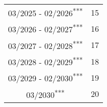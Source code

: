 \begin{tabular}{|c|c|}
	03/2025 - 02/2026\textsuperscript{***} & 15                                  \\
	03/2026 - 02/2027\textsuperscript{***} & 16                                  \\
	03/2027 - 02/2028\textsuperscript{***} & 17                                  \\
	03/2028 - 02/2029\textsuperscript{***} & 18                                  \\
	03/2029 - 02/2030\textsuperscript{***} & 19                                  \\
	03/2030\textsuperscript{***} 		   & 20                                 \\
	\hline
\end{tabular}